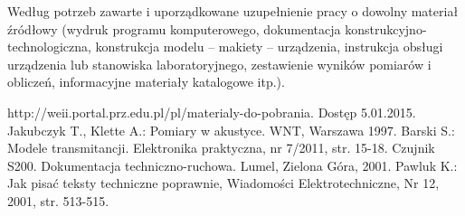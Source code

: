 \documentclass[12pt,twoside]{article}
\begin{document}
Według potrzeb zawarte i uporządkowane uzupełnienie pracy o dowolny materiał źródłowy (wydruk programu komputerowego, dokumentacja kons\-truk\-cyj\-no-\-tech\-no\-lo\-gicz\-na, konstrukcja modelu -- makiety -- urządzenia, instrukcja obsługi urządzenia lub stanowiska laboratoryjnego, zestawienie wyników pomiarów i obliczeń, informacyjne materiały katalogowe itp.).


\clearpage


\begin{thebibliography}{4}
 http://weii.portal.prz.edu.pl/pl/materialy-do-pobrania. Dostęp 5.01.2015.
 Jakubczyk T., Klette A.: Pomiary w akustyce. WNT, Warszawa 1997.
 Barski S.: Modele transmitancji. Elektronika praktyczna, nr 7/2011, str. 15-18.
 Czujnik S200. Dokumentacja techniczno-ruchowa. Lumel, Zielona Góra, 2001.
 Pawluk K.: Jak pisać teksty techniczne poprawnie, Wiadomości Elektrotechniczne, Nr 12, 2001, str. 513-515.
\end{thebibliography}

\clearpage

\makesummary
\end{document}
